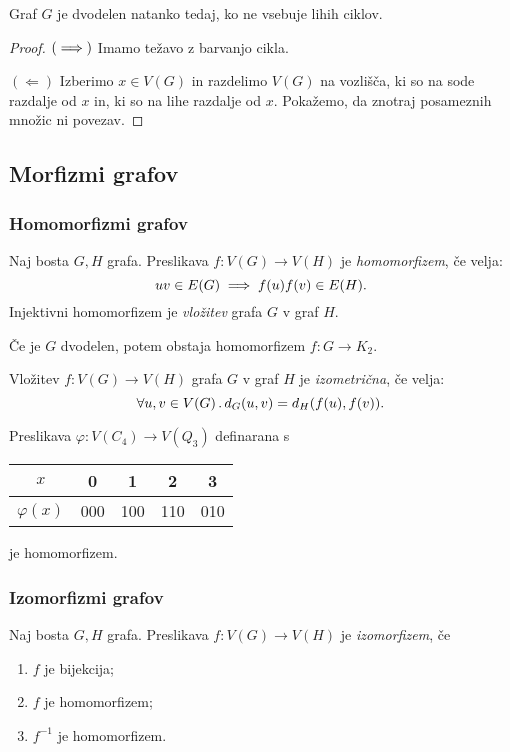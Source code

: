 \begin{izrek}
    Graf $G$ je dvodelen natanko tedaj, ko ne vsebuje lihih ciklov.
\end{izrek}

\begin{proof}
    $(\implies)$ Imamo težavo z barvanjo cikla.
    
    $(\Leftarrow)$ Izberimo $x \in V(G)$ in razdelimo $V(G)$ na vozlišča, ki so na sode razdalje od $x$ in, ki so na lihe razdalje od $x$. Pokažemo, da znotraj posameznih množic ni povezav.
\end{proof}

\subsection{Morfizmi grafov}
\subsubsection*{Homomorfizmi grafov}
\begin{definicija}
    Naj bosta $G, H$ grafa. Preslikava $f: V(G) \to V(H)$ je \emph{homomorfizem}, če velja: $$uv \in E(G) \implies f(u)f(v) \in E(H).$$
    Injektivni homomorfizem je \emph{vložitev} grafa $G$ v graf $H$.
\end{definicija}

\begin{opomba}
    Če je $G$ dvodelen, potem obstaja homomorfizem $f: G \to K_2$.
\end{opomba}

\begin{definicija}
    Vložitev $f: V(G) \to V(H)$ grafa $G$ v graf $H$ je \emph{izometrična}, če velja:
    $$\forall u, v \in V(G) \,.\,d_G(u,v)=d_H(f(u), f(v)).$$
\end{definicija}

\begin{primer}
    Preslikava $\varphi: V(C_4) \to V(Q_3)$ definarana s 
    \begin{center}
        \begin{tabular}{ c | c c c c }
         $x$ & 0 & 1 & 2 & 3 \\ \hline
         $\varphi(x)$ & 000 & 100 & 110 & 010  
        \end{tabular}
    \end{center}
    je homomorfizem.
\end{primer}

\subsubsection*{Izomorfizmi grafov}
\begin{definicija}
    Naj bosta $G, H$ grafa. Preslikava $f: V(G) \to V(H)$ je \emph{izomorfizem}, če
    \begin{enumerate}
        \item $f$ je bijekcija;
        \item $f$ je homomorfizem;
        \item $f^{-1}$ je homomorfizem.
    \end{enumerate}
\end{definicija}

